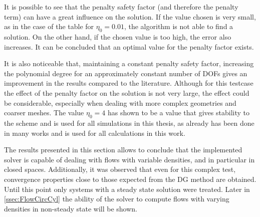It is possible to see that the penalty safety factor (and therefore the penalty term) can have a great influence on the solution. If the value chosen is very small, as in the case of the table for $\eta_0 = 0.01$, the algorithm is not able to find a solution. On the other hand, if the chosen value is too high, the error also increases. It can be concluded that an optimal value for the penalty factor exists.

It is also noticeable that, maintaining a constant penalty safety factor, increasing the polynomial degree for an approximately constant number of DOFs gives an improvement in the results compared to the literature. Although for this testcase the effect of the penalty factor on the solution is not very large, the effect could be considerable, especially when dealing with more complex geometries and coarser meshes. The value $\eta_0 = 4$ has shown to be a value that gives stability to the scheme and is used for all simulations in this thesis, as already has been done in many works \parencite{krauseIncompressibleImmersedBoundary2017,kummerExtendedDiscontinuousGalerkin2017,smudamartinDirectNumericalSimulation2021} and is used for all calculations in this work.
 
The results presented in this section allows to conclude that the implemented solver is capable of dealing with flows with variable densities, and in particular in closed spaces. Additionally, it was observed that even for this complex test, convergence properties close to those expected from the DG method are obtained. Until this point only systems with a steady state solution were treated. Later in \cref{ssec:FlowCircCyl} the ability of the solver to compute flows with varying densities in non-steady state will be shown.
